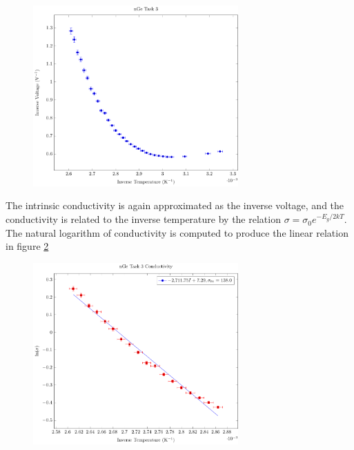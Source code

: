 \documentclass[a4paper]{article}
\begin{document}
\begin{figure}[H]
\centering
\includegraphics[width=0.7\textwidth]{NGePlots/Task3/nGeTask3Norm.pdf}
\label{task33plot}
\end{figure}

\qq The intrinsic conductivity is again approximated as the inverse
voltage, and the conductivity is related to the inverse temperature by
the relation $\sigma = \sigma_0 e^{-E_g/2kT}$. The natural logarithm
of conductivity is computed to produce the linear relation in figure
\ref{task33plotLINEAR}

\begin{figure}[H]
\centering
\includegraphics[width=0.7\textwidth]{NGePlots/Task3/nGeTask3Ln.pdf}
\label{task33plotLINEAR}
\end{figure}
\end{document}

